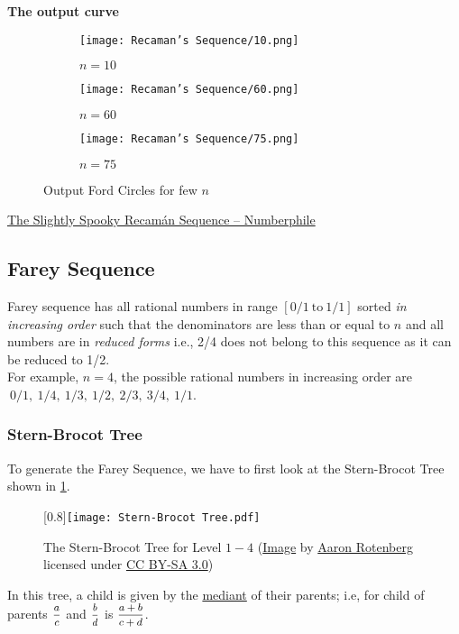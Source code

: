 \textbf{The output curve}
\begin{figure}[H]
	\centering
	\begin{subfigure}{0.3\linewidth}
		\texttt{[image: Recaman's Sequence/10.png]}
		\caption{$n=10$}
	\end{subfigure}
	\begin{subfigure}{0.3\linewidth}
		\texttt{[image: Recaman's Sequence/60.png]}
		\caption{$n=60$}
	\end{subfigure}
	\begin{subfigure}{0.3\linewidth}
		\texttt{[image: Recaman's Sequence/75.png]}
		\caption{$n=75$}
	\end{subfigure}
	\caption{Output Ford Circles for few $n$}
\end{figure}
\begin{funvideo}
	\href{https://youtu.be/FGC5TdIiT9U}{The Slightly Spooky Recamán Sequence -- Numberphile}
\end{funvideo}
\subsection{Farey Sequence}{\label{pp:fareysequence}}
Farey sequence has all rational numbers in range $[0/1\ \text{to}\ 1/1]$ sorted \emph{in increasing order} such that the denominators are less than or equal to $n$ and all numbers are in \emph{reduced forms} i.e., 2/4 does not belong to this sequence as it can be reduced to 1/2.\\
For example, $n=4$, the possible rational numbers in increasing order are $\ 0/1,\ 1/4,\ 1/3,\ 1/2,\ 2/3,\ 3/4,\ 1/1$.
\vspace{-1em}
\subsubsection*{Stern-Brocot Tree}
\vspace{-0.7em}
To generate the Farey Sequence, we have to first look at the {Stern-Brocot Tree} shown in \ref{fig:sternbrocottree}.
\begin{figure}[H]
	\centering
	\scalebox{1}[0.8]{\texttt{[image: Stern-Brocot Tree.pdf]}}
	\caption{The Stern-Brocot Tree for Level $1-4$ (\href{https://commons.wikimedia.org/wiki/File:SternBrocotTree.svg}{Image} by \href{https://commons.wikimedia.org/wiki/User:Aaron_Rotenberg}{Aaron Rotenberg} licensed under \href{https://creativecommons.org/licenses/by-sa/3.0/}{CC BY-SA 3.0})}
	\label{fig:sternbrocottree}
\end{figure}
In this tree, a child is given by the \href{https://en.wikipedia.org/wiki/Mediant_(mathematics)}{mediant} of their parents; i.e, for child of parents $\mfrac{a}{c}$ and $\mfrac{b}{d}$ is $\mfrac{a+b}{c+d}$.

